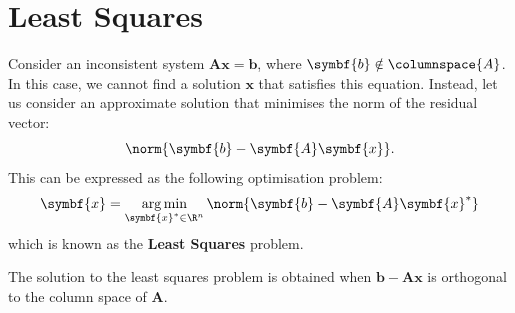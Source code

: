 \documentclass{article}
\DeclareMathOperator*{\argmin}{arg\,min}
\begin{document}
\section{Least Squares}
Consider an inconsistent system \(\symbf{A}\symbf{x} = \symbf{b}\),
where \(\symbf{b} \notin \columnspace{A}\). In this case, we cannot
find a solution \(\symbf{x}\) that satisfies this equation. Instead,
let us consider an approximate solution that minimises the norm of the
residual vector:
\begin{equation*}
    \norm{\symbf{b} - \symbf{A}\symbf{x}}.
\end{equation*}
This can be expressed as the following optimisation problem:
\begin{equation*}
    \symbf{x} = \argmin_{\symbf{x}^\ast \in \R^n} \norm{\symbf{b} - \symbf{A}\symbf{x}^\ast}
\end{equation*}
which is known as the \textbf{Least Squares} problem.
\begin{theorem}
    The solution to the least squares problem is obtained when
    \(\symbf{b} - \symbf{A}\symbf{x}\) is orthogonal to the column space of \(\symbf{A}\).
\end{theorem}
\end{document}
